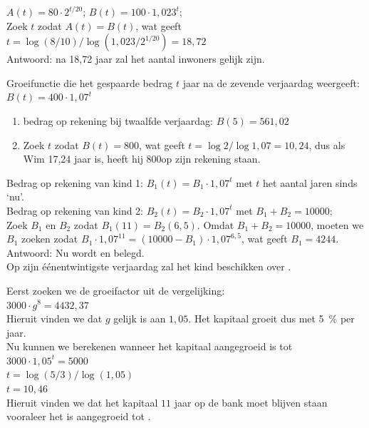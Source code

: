 \begin{Oplossing}{6.8}
	$A(t)=80\cdot 2^{t/20}$; $B(t)=100\cdot 1,023^t$;\\
	Zoek $t$ zodat $A(t)=B(t)$, wat geeft $t=\log(8/10)/\log(1,023/2^{1/20})=18,72$\\
	Antwoord: na 18,72 jaar zal het aantal inwoners gelijk zijn.
      
\end{Oplossing}
\begin{Oplossing}{6.9}
  		Groeifunctie die het gespaarde bedrag $t$ jaar na de zevende verjaardag weergeeft: $B(t)=400\cdot 1,07^t$\\
  		\begin{enumerate}
  		\item bedrag op rekening bij twaalfde verjaardag: $B(5)=561,02$
  		\item Zoek $t$ zodat $B(t)=800$, wat geeft $t=\log2/\log1,07=10,24$, dus als Wim 17,24 jaar is, heeft hij 800\euros op zijn rekening staan.
  		\end{enumerate}
      
\end{Oplossing}
\begin{Oplossing}{6.10}
Bedrag op rekening van kind 1: $B_1(t)=B_1\cdot 1,07^t$ met $t$ het aantal jaren sinds `nu'.\\
Bedrag op rekening van kind 2: $B_2(t)=B_2\cdot 1,07^t$ met $B_1+B_2=\num{10000}$; \\
Zoek $B_1$ en $B_2$ zodat $B_1(11)=B_2(6,5)$. Omdat $B_1+B_2=\num{10000}$, moeten we $B_1$ zoeken zodat
$B_1\cdot 1,07^{11}=(10000-B_1)\cdot 1,07^{6,5}$, wat geeft $B_1=4244$. \\
Antwoord: Nu wordt  en  belegd.\\
Op zijn  \'{e}\'{e}nentwintigste verjaardag zal het kind beschikken over .
\end{Oplossing}
\begin{Oplossing}{6.11}
Eerst zoeken we de groeifactor uit de vergelijking:\\
$3000\cdot g^{8} = 4432,37$\\
Hieruit vinden we dat $g$ gelijk is aan $1,05$. Het kapitaal groeit dus met \SI{5}{\percent} per jaar.\\
Nu kunnen we berekenen wanneer het kapitaal aangegroeid is tot \\
$3000\cdot 1,05^{t} = 5000$\\
$t = \log(5/3)/\log(1,05)$\\
$t = 10,46$\\
Hieruit vinden we dat het kapitaal $11$ jaar op de bank moet blijven staan vooraleer het is aangegroeid tot .

   
\end{Oplossing}
